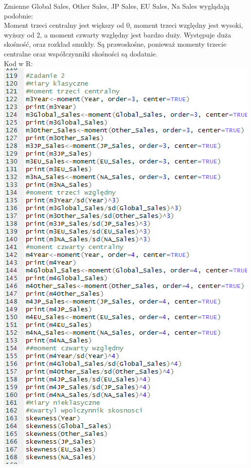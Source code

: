 \documentclass[12pt]{article}
\begin{document}
       Zmienne Global Sales, Other Sales, JP Sales, EU Sales, Na Sales wyglądają podobnie:\\
Moment trzeci centralny jest większy od 0, moment trzeci względny jest wysoki, wyższy od 2, a moment czwarty względny jest bardzo duży. Występuje duża skośność, oraz rozkład smukły. Są prawoskośne, ponieważ momenty trzecie centralne oraz współczynniki skośności są dodatnie.\\
\newpage
	Kod w R:\\
	\includegraphics[scale=0.7]{Zad2}
	
	\newpage
\end{document}
